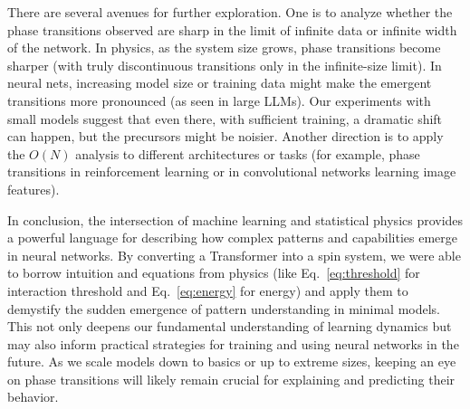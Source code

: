 \documentclass[12pt]{article}
\begin{document}
There are several avenues for further exploration. One is to analyze whether the phase transitions observed are sharp in the limit of infinite data or infinite width of the network. In physics, as the system size grows, phase transitions become sharper (with truly discontinuous transitions only in the infinite-size limit). In neural nets, increasing model size or training data might make the emergent transitions more pronounced (as seen in large LLMs). Our experiments with small models suggest that even there, with sufficient training, a dramatic shift can happen, but the precursors might be noisier. Another direction is to apply the $O(N)$ analysis to different architectures or tasks (for example, phase transitions in reinforcement learning or in convolutional networks learning image features).

In conclusion, the intersection of machine learning and statistical physics provides a powerful language for describing how complex patterns and capabilities emerge in neural networks. By converting a Transformer into a spin system, we were able to borrow intuition and equations from physics (like Eq.~\ref{eq:threshold} for interaction threshold and Eq.~\ref{eq:energy} for energy) and apply them to demystify the sudden emergence of pattern understanding in minimal models. This not only deepens our fundamental understanding of learning dynamics but may also inform practical strategies for training and using neural networks in the future. As we scale models down to basics or up to extreme sizes, keeping an eye on phase transitions will likely remain crucial for explaining and predicting their behavior.
\end{document}
